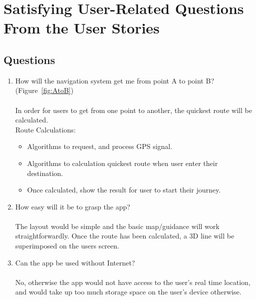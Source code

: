 \newpage

\section{Satisfying User-Related Questions From the User Stories}
\subsection*{Questions}
\begin{enumerate}
    \item How will the navigation system get me from point A to point B? (Figure~\ref{fig:AtoB})\\\\
    In order for users to get from one point to another, the quickest route will be calculated.\\
    Route Calculations:
    \begin{itemize}
        \item Algorithms to request, and process GPS signal.
        \item Algorithms to calculation quickest route when user enter their destination.
        \item Once calculated, show the result for user to start their journey.
    \end{itemize}
    
    \item How easy will it be to grasp the app?\\\\
    The layout would be simple and the basic map/guidance will work straightforwardly. Once the route has been calculated, a 3D line will be superimposed on the users screen.
    
    \item Can the app be used without Internet? \\\\
    No, otherwise the app would not have access to the user's real time location, and would take up too much storage space on the user's device otherwise.
\end{enumerate}